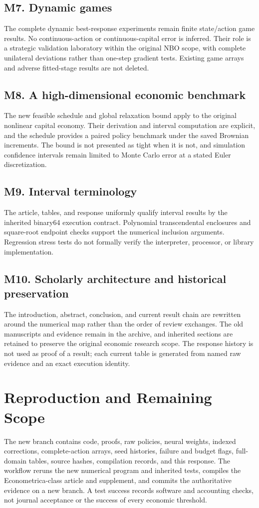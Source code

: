 \subsection*{M7. Dynamic games}
The complete dynamic best-response experiments remain finite state/action game results. No continuous-action or continuous-capital error is inferred. Their role is a strategic validation laboratory within the original NBO scope, with complete unilateral deviations rather than one-step gradient tests. Existing game arrays and adverse fitted-stage results are not deleted.

\subsection*{M8. A high-dimensional economic benchmark}
The new feasible schedule and global relaxation bound apply to the original nonlinear capital economy. Their derivation and interval computation are explicit, and the schedule provides a paired policy benchmark under the saved Brownian increments. The bound is not presented as tight when it is not, and simulation confidence intervals remain limited to Monte Carlo error at a stated Euler discretization.

\subsection*{M9. Interval terminology}
The article, tables, and response uniformly qualify interval results by the inherited binary64 execution contract. Polynomial transcendental enclosures and square-root endpoint checks support the numerical inclusion arguments. Regression stress tests do not formally verify the interpreter, processor, or library implementation.

\subsection*{M10. Scholarly architecture and historical preservation}
The introduction, abstract, conclusion, and current result chain are rewritten around the numerical map rather than the order of review exchanges. The old manuscripts and evidence remain in the archive, and inherited sections are retained to preserve the original economic research scope. The response history is not used as proof of a result; each current table is generated from named raw evidence and an exact execution identity.

\section{Reproduction and Remaining Scope}
The new branch contains code, proofs, raw policies, neural weights, indexed corrections, complete-action arrays, seed histories, failure and budget flags, full-domain tables, source hashes, compilation records, and this response. The workflow reruns the new numerical program and inherited tests, compiles the Econometrica-class article and supplement, and commits the authoritative evidence on a new branch. A test success records software and accounting checks, not journal acceptance or the success of every economic threshold.

